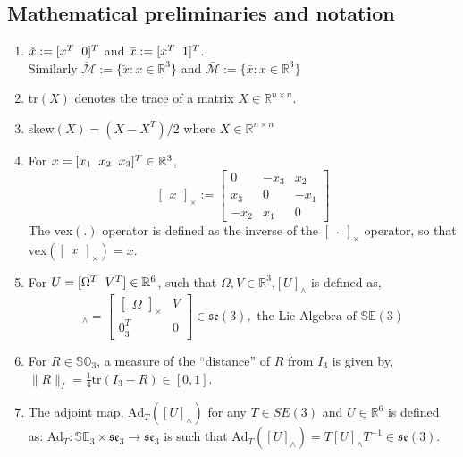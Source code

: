 \documentclass[12pt]{article}
\def\omani#1{\breve{#1}}
\def\cross#1{\begin{bmatrix} #1 \end{bmatrix}_\times}
\begin{document}
\subsection{Mathematical preliminaries and notation}
\begin{enumerate} %
    \setlength\itemsep{-4pt}
    \item $\omani{x} := [x^T \hspace{2mm} 0]^T$ and $\bar{x} := [x^T \hspace{2mm} 1]^T$. \\ Similarly $\omani{\mathcal{M}} := \{\omani x : x \in \mathbb{R}^3\}$ and 
     $\bar{\mathcal{M}} := \{\bar x : x \in \mathbb{R}^3\}$
    \item tr$(X)$ denotes the trace of a matrix $X \in \mathbb{R}^{n \times n}$.
    \item skew$(X) = (X - X^T)/2$ where $X \in \mathbb{R}^{n \times n}$  
    \item For $x = [x_1 \hspace{2mm} x_2 \hspace{2mm} x_3]^T \in  \mathbb{R}^3$, 
    \[ \cross{x} := \begin{bmatrix}
        0 & -x_3 & x_2 \\
        x_3 & 0 & -x_1 \\
        -x_2 & x_1 & 0
    \end{bmatrix}\] 
    The vex$(.)$ operator is defined as the inverse of the $\cross{.}$ operator, so that vex$(\cross{x}) = x$.
    \item For $U = [\Omega^T \hspace{2mm} V^T] \in \mathbb{R}^6$, such that $\Omega, V \in \mathbb{R}^3$,$[U]_\wedge$ is defined as,
    \begin{equation}
        [U]_\wedge = \begin{bmatrix}
            \cross{\Omega} & V \\
            \underbar{0}_3^T & 0
        \end{bmatrix} \in \mathfrak{se}(3), \text{ the Lie Algebra of } \mathbb{SE}(3)
    \end{equation}
    \item For $R \in \mathbb{SO}_3$, a measure of the ``distance'' of $R$ from $I_3$ is given by, \\$\|R\|_I = \frac{1}{4} \text{tr}(I_3 - R) \in [0,1]$.
    \item The adjoint map, $\text{Ad}_T ([U]_\wedge)$ for any $T \in SE(3)$ and $U \in \mathbb{R}^6$ is defined as: Ad$_T : \mathbb{SE}_3 \times \mathfrak{se}_3 \rightarrow \mathfrak{se}_3$  is such that $\text{Ad}_T([U]_\wedge) = T[U]_\wedge T^{-1} \in \mathfrak{se}(3)  $.

\end{enumerate}
\end{document}
